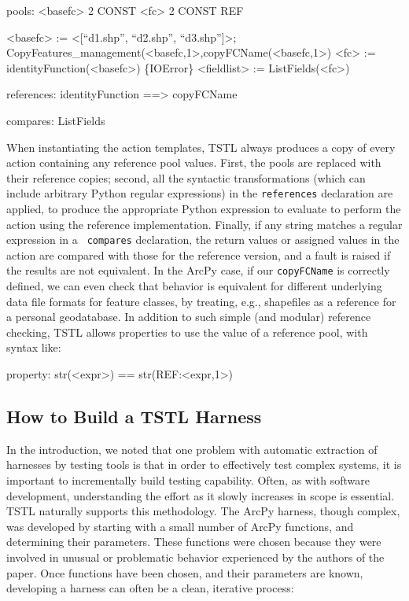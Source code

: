 {\scriptsize
\begin{code}
pools:
  <basefc> 2 CONST
  <fc> 2 CONST REF

<basefc> := <[``d1.shp'', ``d2.shp'', ``d3.shp'']>; \\
  CopyFeatures\_management(<basefc,1>,copyFCName(<basefc,1>)
<fc> := identityFunction(<basefc>)
\{IOError\} <fieldlist> := ListFields(<fc>)

references:
  identityFunction ==> copyFCName

compares:
  ListFields
\end{code}
}

When instantiating the action templates, TSTL always produces a copy
of every action containing any reference pool values.  First, the pools
are replaced with their reference copies; second, all the
syntactic transformations (which can include arbitrary Python regular
expressions) in the {\tt references} declaration are applied, to
produce the appropriate Python expression to evaluate to perform the
action using the reference implementation.
Finally, if any string matches a regular expression in a {\tt
  compares} declaration, the return values or assigned values in the
action are compared with those for the reference version, and a fault
is raised if the results are not equivalent.  In the
ArcPy case, if our {\tt copyFCName} is correctly defined, we can even
check that behavior is equivalent for different underlying data file
formats for feature classes, by treating, e.g., shapefiles as a
reference for a personal geodatabase.  In addition to such simple (and
modular) reference checking, TSTL allows properties to use the value
of a reference pool, with syntax like:

{\scriptsize
\begin{code}
property:  str(<expr>) == str(REF:<expr,1>)
\end{code}
}

\subsection{How to Build a TSTL Harness}

In the introduction, we noted that one problem with automatic
extraction of harnesses by testing tools is that in order to effectively test
complex systems, it is important to incrementally build testing
capability.  Often, as with software development, understanding the
effort as it slowly increases in scope is essential.  TSTL
naturally supports this methodology.  The ArcPy harness, though
complex, was developed by starting with a small number of ArcPy
functions, and determining their parameters.  These functions were
chosen because they were involved in unusual or problematic behavior
experienced by the authors of the paper.  Once
functions have been chosen, and their parameters are known,
developing a harness can often be a clean, iterative process:

